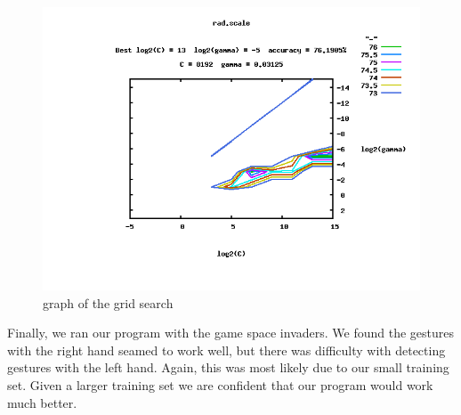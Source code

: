 \documentclass[11pt,conference]{IEEEtran}
\begin{document}
\begin{figure}[h]
\caption{graph of the grid search}
\centering
\includegraphics[width=\linewidth]{scale}
\end{figure}

Finally, we ran our program with the game space invaders. We found the gestures with the right hand seamed to work well, but there was difficulty with detecting gestures with the left hand. Again, this was most likely due to our small training set. Given a larger training set we are confident that our program would work much better.
\end{document}
